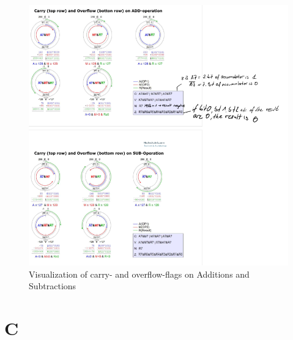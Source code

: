 \documentclass[a4paper, 11pt, nofootinbib]{book}
\begin{document}
\begin{figure}[htb]
	\centering
	\includegraphics[keepaspectratio=true,height=40\baselineskip]{flags_2.PNG}
	\caption{Visualization of carry- and overflow-flags on Additions and Subtractions}
	\label{fig:flags_2}
\end{figure}

\chapter{C}
\end{document}
